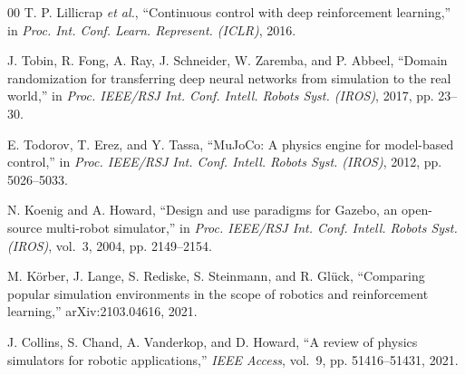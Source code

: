 \documentclass{ieeeaccess}
\begin{document}
\begin{thebibliography}{00}
 T. P. Lillicrap \emph{et al.}, ``Continuous control with deep reinforcement learning,'' in
\emph{Proc. Int. Conf. Learn. Represent. (ICLR)}, 2016.



 J. Tobin, R. Fong, A. Ray, J. Schneider, W. Zaremba, and P. Abbeel, ``Domain randomization
for transferring deep neural networks from simulation to the real world,'' in \emph{Proc. IEEE/RSJ Int.
Conf. Intell. Robots Syst. (IROS)}, 2017, pp. 23--30.


E. Todorov, T. Erez, and Y. Tassa, ``MuJoCo: A physics engine for model-based control,''
in \emph{Proc. IEEE/RSJ Int. Conf. Intell. Robots Syst. (IROS)}, 2012, pp. 5026--5033.



N. Koenig and A. Howard, ``Design and use paradigms for Gazebo, an open-source multi-robot
simulator,'' in \emph{Proc. IEEE/RSJ Int. Conf. Intell. Robots Syst. (IROS)}, vol.~3, 2004, pp. 2149--2154.



M. K\"orber, J. Lange, S. Rediske, S. Steinmann, and R. Gl\"uck, ``Comparing popular simulation
environments in the scope of robotics and reinforcement learning,'' arXiv:2103.04616, 2021.



J. Collins, S. Chand, A. Vanderkop, and D. Howard, ``A review of physics simulators
for robotic applications,'' \emph{IEEE Access}, vol.~9, pp. 51416--51431, 2021.



\end{thebibliography}
\end{document}
